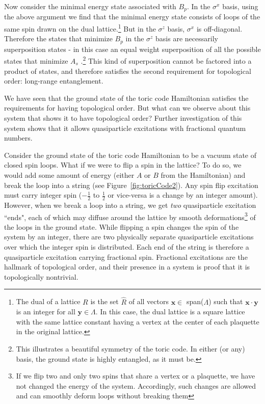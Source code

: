 Now consider the minimal energy state associated with $B_{p}$. In the $\sigma^{x}$ basis, using the above argument we find that the minimal energy state consists of loops of the same spin drawn on the dual lattice.\footnote{The dual of a lattice $R$ is the set $\hat{R}$ of all vectors $\mathbf{x} \in$ span($\Lambda$) such that $\mathbf{x} \cdot \mathbf{y}$ is an integer for all $\mathbf{y} \in \Lambda$. In this case, the dual lattice is a square lattice with the same lattice constant having a vertex at the center of each plaquette in the original lattice.} But in the $\sigma^{z}$ basis, $\sigma^{x}$ is off-diagonal. Therefore the states that minimize $B_{p}$ in the $\sigma^{z}$ basis are necessarily superposition states - in this case an equal weight superposition of all the possible states that minimize $A_{s}$ \cite{Savary2017}.\footnote{This illustrates a beautiful symmetry of the toric code. In either (or any) basis, the ground state is highly entangled, as it must be.} This kind of superposition cannot be factored into a product of states, and therefore satisfies the second requirement for topological order: long-range entanglement.

We have seen that the ground state of the toric code Hamiltonian satisfies the requirements for having topological order. But what can we observe about this system that shows it to have topological order? Further investigation of this system shows that it allows quasiparticle excitations with fractional quantum numbers.

Consider the ground state of the toric code Hamiltonian to be a vacuum state of closed spin loops. What if we were to flip a spin in the lattice? To do so, we would add some amount of energy (either $A$ or $B$ from the Hamiltonian) and break the loop into a string (see Figure~\ref{fig:toricCode2}). Any spin flip excitation must carry integer spin ($-\frac{1}{2}$ to $\frac{1}{2}$ or vice-versa is a change by an integer amount). However, when we break a loop into a string, we get \textit{two} quasiparticle excitation ``ends", each of which may diffuse around the lattice by smooth deformations\footnote{If we flip two and only two spins that share a vertex or a plaquette, we have not changed the energy of the system. Accordingly, such changes are allowed and can smoothly deform loops without breaking them} of the loops in the ground state. While flipping a spin changes the spin of the system by an integer, there are two physically separate quasiparticle excitations over which the integer spin is distributed. Each end of the string is therefore a quasiparticle excitation carrying fractional spin. Fractional excitations are the hallmark of topological order, and their presence in a system is proof that it is topologically nontrivial.

